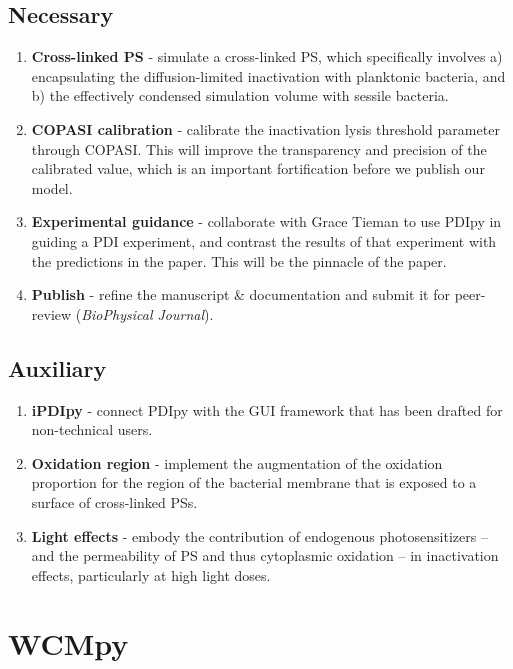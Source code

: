 \subsection{Necessary}
\begin{enumerate}
    \item \textbf{Cross-linked PS} - simulate a cross-linked PS, which specifically involves a) encapsulating the diffusion-limited inactivation with planktonic bacteria, and b) the effectively condensed simulation volume with sessile bacteria.
    \item \textbf{COPASI calibration} - calibrate the inactivation lysis threshold parameter through COPASI. This will improve the transparency and precision of the calibrated value, which is an important fortification before we publish our model.
    \item \textbf{Experimental guidance} - collaborate with Grace Tieman to use PDIpy in guiding a PDI experiment, and contrast the results of that experiment with the predictions in the paper. This will be the pinnacle of the paper.
    \item \textbf{Publish} - refine the manuscript \& documentation and submit it for peer-review (\textit{BioPhysical Journal}).
\end{enumerate}

\subsection{Auxiliary}
\begin{enumerate}
    \item \textbf{iPDIpy} - connect PDIpy with the GUI framework that has been drafted for non-technical users.
    \item \textbf{Oxidation region} - implement the augmentation of the oxidation proportion for the region of the bacterial membrane that is exposed to a surface of cross-linked PSs.
    \item \textbf{Light effects} - embody the contribution of endogenous photosensitizers -- and the permeability of PS and thus cytoplasmic oxidation -- in inactivation effects, particularly at high light doses. 
\end{enumerate}

\section{WCMpy}
